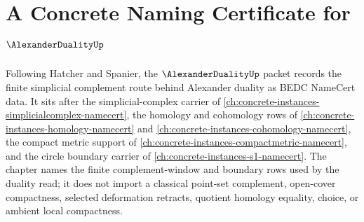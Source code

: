 \chapter{A Concrete Naming Certificate for $\AlexanderDualityUp$}
\label{ch:concrete-instances-alexander-duality-namecert}

Following Hatcher and Spanier, the $\AlexanderDualityUp$ packet records the finite simplicial complement route behind Alexander duality as BEDC NameCert data. It sits after the simplicial-complex carrier of \autoref{ch:concrete-instances-simplicialcomplex-namecert}, the homology and cohomology rows of \autoref{ch:concrete-instances-homology-namecert} and \autoref{ch:concrete-instances-cohomology-namecert}, the compact metric support of \autoref{ch:concrete-instances-compactmetric-namecert}, and the circle boundary carrier of \autoref{ch:concrete-instances-s1-namecert}. The chapter names the finite complement-window and boundary rows used by the duality read; it does not import a classical point-set complement, open-cover compactness, selected deformation retracts, quotient homology equality, choice, or ambient local compactness.

